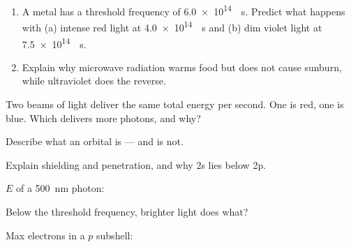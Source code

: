 \documentclass{apchem-notes}
\begin{document}
\begin{enumerate}[leftmargin=*,itemsep=0.4em]
  \item A metal has a threshold frequency of
        \SI{6.0e14}{\per\second}. Predict what happens with (a) intense
        red light at \SI{4.0e14}{\per\second} and (b) dim violet light
        at \SI{7.5e14}{\per\second}.
  \item Explain why microwave radiation warms food but does not cause
        sunburn, while ultraviolet does the reverse.
\end{enumerate}

\begin{exitticket}
Two beams of light deliver the same total energy per second. One is red, one
is blue. Which delivers more photons, and why? 
\end{exitticket}


\begin{objectives}
  \item Describe what an orbital is --- and is not.
  \item Explain shielding and penetration, and why 2s lies below 2p.
\end{objectives}


\begin{warmup}[3]
  \item $E$ of a \SI{500}{\nano\meter} photon:
  \item Below the threshold frequency, brighter light does what?
  \item Max electrons in a $p$ subshell: 
\end{warmup}
\end{document}

